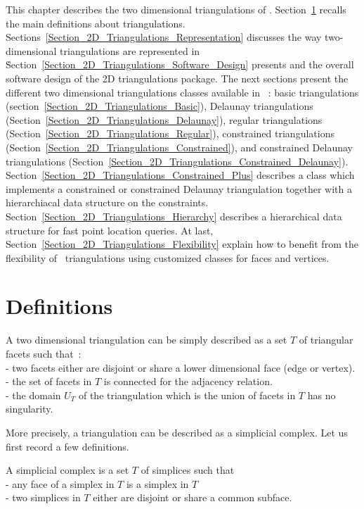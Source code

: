This chapter describes the two dimensional triangulations
of \cgal. 
Section~\ref{Section_2D_Triangulations_Definitions} recalls the
main definitions about triangulations.
Sections~\ref{Section_2D_Triangulations_Representation} discusses
the way two-dimensional triangulations are represented in \cgal\.
Section~\ref{Section_2D_Triangulations_Software_Design} presents
and the overall software
design of the 2D triangulations package. 
The next sections present the different two dimensional triangulations classes
available in  \cgal\ : 
basic triangulations (section~\ref{Section_2D_Triangulations_Basic}),
Delaunay triangulations
(Section~\ref{Section_2D_Triangulations_Delaunay}),
regular triangulations
(Section~\ref{Section_2D_Triangulations_Regular}),
constrained triangulations
(Section~\ref{Section_2D_Triangulations_Constrained}),
and constrained Delaunay triangulations
(Section~\ref{Section_2D_Triangulations_Constrained_Delaunay}).
Section~\ref{Section_2D_Triangulations_Constrained_Plus}
describes a class which implements a constrained or
constrained Delaunay triangulation together with
a hierarchiacal data structure on the constraints.
Section~\ref{Section_2D_Triangulations_Hierarchy}
describes a hierarchical data structure for
fast point location queries.
At last, Section~\ref{Section_2D_Triangulations_Flexibility} 
explain how to benefit  from the flexibility 
of  \cgal\ triangulations using customized classes for faces
and vertices.

\section{Definitions}
\label{Section_2D_Triangulations_Definitions}

A two dimensional triangulation can be simply described as a set $T$
of triangular facets such that~:\\
- two facets either are  disjoint or share a lower dimensional
face (edge or vertex).\\
- the set of facets in  $T$ is connected for the adjacency relation. \\
- the domain $U_T$ of the triangulation which is the union
of facets in $T$ has no singularity. 


More precisely, a triangulation can be described 
as a simplicial complex.
Let us first record a few definitions.

A simplicial complex is a set $T$  of simplices such that~\\
- any face of a simplex in $T$ is a simplex in $T$ \\
- two simplices in $T$  either are disjoint or  share
  a common subface.

